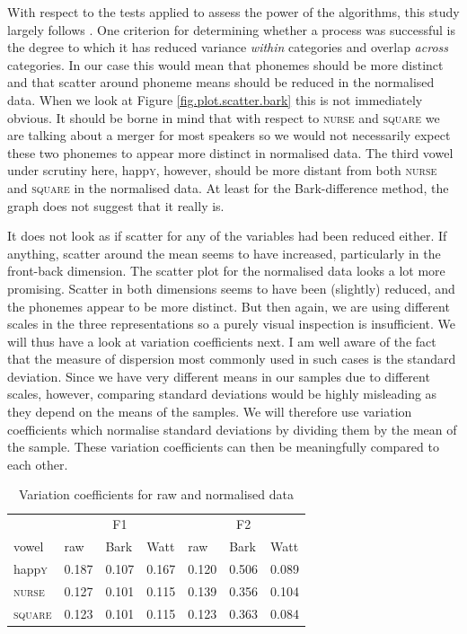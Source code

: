 With respect to the tests applied to assess the power of the  algorithms, this study largely follows \citealt{langstrofdiss}.
One criterion for determining whether a  process was successful is the degree to which it has reduced variance \emph{within} categories and overlap \emph{across} categories.
In our case this would mean that phonemes should be more distinct and that scatter around phoneme means should be reduced in the normalised data.
When we look at Figure \ref{fig.plot.scatter.bark} this is not immediately obvious.
It should be borne in mind that with respect to \textsc{nurse} and \textsc{square} we are talking about a merger for most speakers so we would not necessarily expect these two phonemes to appear more distinct in normalised data.
The third vowel under scrutiny here, happ\textsc{y}, however, should be more distant from both \textsc{nurse} and \textsc{square} in the normalised data.
At least for the Bark-difference method, the graph does not suggest that it really is.

It does not look as if scatter for any of the variables had been reduced either.
If anything, scatter around the mean seems to have increased, particularly in the front-back dimension.
The scatter plot for the \citeauthor{wattfabricius2002} normalised data looks a lot more promising.
Scatter in both dimensions seems to have been (slightly) reduced, and the phonemes appear to be more distinct.
But then again, we are using different scales in the three representations so a purely visual inspection is insufficient.
We will thus have a look at variation coefficients next.
I am well aware of the fact that the measure of dispersion most commonly used in such cases is the standard deviation. Since we have very different means in our samples due to different scales, however, comparing standard deviations would be highly misleading as they depend on the means of the samples. We will therefore use variation coefficients which normalise standard deviations by dividing them by the mean of the sample. These variation coefficients can then be meaningfully compared to each other.

\begin{table}[h]
	\centering
	\caption{Variation coefficients for raw and normalised data}
	\begin{tabular}{lllllll}
		\hline
		& \multicolumn{3}{c}{F1} & \multicolumn{3}{c}{F2}\\
		vowel & raw & Bark & Watt & raw & Bark & Watt\\
		\hline
		happ\textsc{y} &
		0.187 & 0.107 & 0.167 &
		0.120 & 0.506 & 0.089\\
		\textsc{nurse} &
		0.127 & 0.101 & 0.115 &
		0.139 & 0.356 & 0.104\\
		\textsc{square} &
		0.123 & 0.101 & 0.115 &
		0.123 & 0.363 & 0.084\\
		\hline
	\end{tabular}
	\label{tab.varcoeff}
\end{table}

